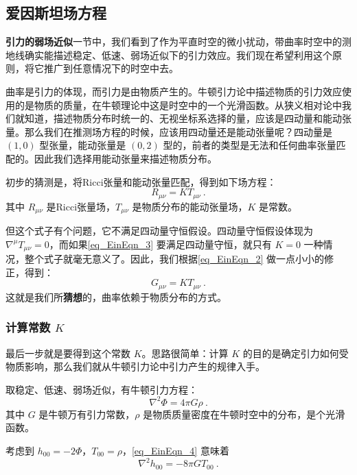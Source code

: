 \subsection{爱因斯坦场方程}

\textbf{引力的弱场近似}一节中，我们看到了作为平直时空的微小扰动，带曲率时空中的测地线确实能描述稳定、低速、弱场近似下的引力效应。我们现在希望利用这个原则，将它推广到任意情况下的时空中去。

曲率是引力的体现，而引力是由物质产生的。牛顿引力论中描述物质的引力效应使用的是物质的质量，在牛顿理论中这是时空中的一个光滑函数。从狭义相对论中我们就知道，描述物质分布时统一的、无视坐标系选择的量，应该是四动量和能动张量。那么我们在推测场方程的时候，应该用四动量还是能动张量呢？四动量是 $(1, 0)$ 型张量，能动张量是 $(0, 2)$ 型的，前者的类型是无法和任何曲率张量匹配的。因此我们选择用能动张量来描述物质分布。

初步的猜测是，将Ricci张量和能动张量匹配，得到如下场方程：
\begin{equation}\label{eq_EinEqn_3}
R_{\mu\nu}=KT_{\mu\nu}~.
\end{equation}
其中 $R_{\mu\nu}$ 是Ricci张量场，$T_{\mu\nu}$ 是物质分布的能动张量场，$K$ 是常数。

但这个式子有个问题，它不满足四动量守恒假设。四动量守恒假设体现为 $\nabla^\mu T_{\mu\nu}=0$，而如果\autoref{eq_EinEqn_3} 要满足四动量守恒，就只有 $K=0$ 一种情况，整个式子就毫无意义了。因此，我们根据\autoref{eq_EinEqn_2} 做一点小小的修正，得到：
\begin{equation}
G_{\mu\nu}=KT_{\mu\nu}~.
\end{equation}
这就是我们所\textbf{猜想}的，曲率依赖于物质分布的方式。



\subsubsection{计算常数 $K$}


最后一步就是要得到这个常数 $K$。思路很简单：计算 $K$ 的目的是确定引力如何受物质影响，那么我们就从牛顿引力论中引力产生的规律入手。

取稳定、低速、弱场近似，有牛顿引力方程：
\begin{equation}\label{eq_EinEqn_4}
\nabla^2\Phi=4\pi G\rho~.
\end{equation}
其中 $G$ 是牛顿万有引力常数，$\rho$ 是物质质量密度在牛顿时空中的分布，是个光滑函数。

考虑到 $h_{00}=-2\Phi$，$T_{00}=\rho$，\autoref{eq_EinEqn_4} 意味着
\begin{equation}\label{eq_EinEqn_7}
\nabla^2h_{00}=-8\pi G T_{00}~.
\end{equation}



